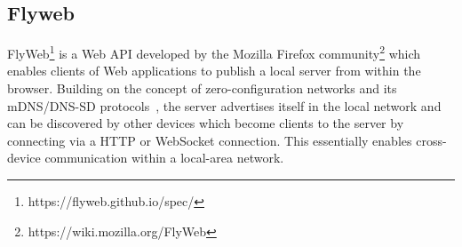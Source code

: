 \subsection{Flyweb}
\label{sec:flyweb}

FlyWeb\footnote{https://flyweb.github.io/spec/} is a Web API developed by the Mozilla Firefox community\footnote{https://wiki.mozilla.org/FlyWeb} which enables clients of Web applications to publish a local server from within the browser. Building on the concept of zero-configuration networks and its mDNS/DNS-SD protocols~\cite{rfc6762, rfc6763}, the server advertises itself in the local network and can be discovered by other devices which become clients to the server by connecting via a HTTP or WebSocket connection. This essentially enables cross-device communication within a local-area network.